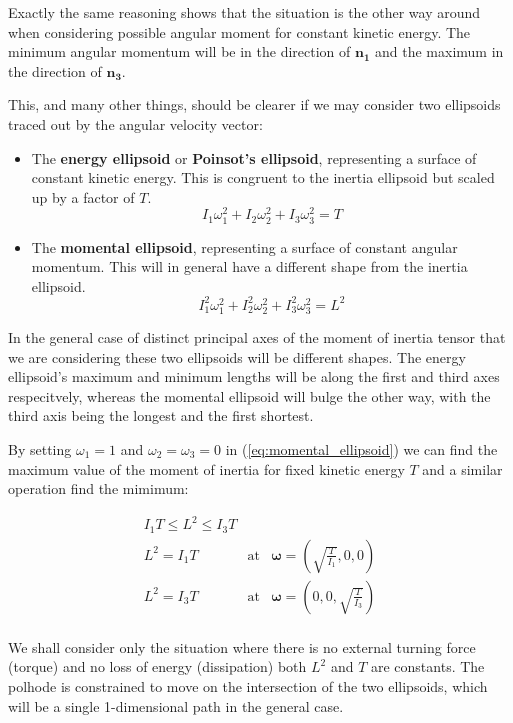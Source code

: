 \documentclass[a4paper, 12pt]{article}
\begin{document}
Exactly the same reasoning shows that the situation is the other way around when considering possible angular moment for constant kinetic energy. The minimum angular momentum will be in the direction of $\bm{n_1}$ and the maximum in the direction of $\bm{n_3}$.

This, and many other things, should be clearer if we may consider two ellipsoids traced out by the angular velocity vector:
\begin{itemize}
\item The {\bf energy ellipsoid} or {\bf Poinsot's ellipsoid}, representing a surface of constant kinetic energy. This is congruent to the inertia ellipsoid but scaled up by a factor of $T$.
  \begin{equation}\label{eq:energy_ellipsoid}
    I_1\omega_1^2 + I_2\omega_2^2 + I_3\omega_3^2 =T
  \end{equation}
\item The {\bf momental ellipsoid}, representing a surface of constant angular momentum. This will in general have a different shape from the inertia ellipsoid.
  \begin{equation}\label{eq:momental_ellipsoid}
    I_1^2\omega_1^2 + I_2^2\omega_2^2 + I_3^2\omega_3^2 = L^2
  \end{equation}
\end{itemize}

In the general case of distinct principal axes of the moment of inertia tensor that we are considering these two ellipsoids will be different shapes. The energy ellipsoid's maximum and minimum lengths will be along the first and third axes respecitvely, whereas the momental ellipsoid will bulge the other way, with the third axis being the longest and the first shortest.

By setting $\omega_1=1$ and $\omega_2=\omega_3=0$ in (\ref{eq:momental_ellipsoid}) we can find the maximum value of the moment of inertia for fixed kinetic energy $T$ and a similar operation find the mimimum:

\begin{eqnarray*}
  I_1T \leq L^2 \leq I_3 T \\
  L^2=I_1T & \textrm{at} & \mathbf{\omega}=(\sqrt{\frac{T}{I_1}}, 0, 0) \\
  L^2=I_3T & \textrm{at} & \mathbf{\omega}=(0, 0, \sqrt{\frac{T}{I_3}}) \\
\end{eqnarray*}

We shall consider only the situation where there is no external turning force (torque) and no loss of energy (dissipation) both $L^2$ and $T$ are constants. The polhode is constrained to move on the intersection of the two ellipsoids, which will be a single 1-dimensional path in the general case.
\end{document}

